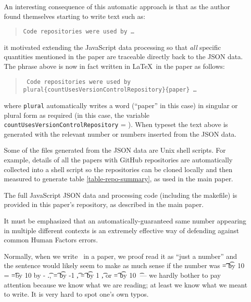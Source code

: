 \documentclass{article}
\begin{document}
An interesting consequence of this automatic approach is that as the author found themselves starting to write text such as:

\begin{quote}
\tt Code repositories were used by  \ldots
\end{quote}

it motivated extending the JavaScript data processing so that \emph{all\/} specific quantities mentioned in the paper are traceable directly back to the JSON data. The phrase above is now in fact written in \LaTeX\ in the paper as follows:

\begin{quote}\tt\small
Code repositories were used by \\
\bslash plural\{\bslash countUsesVersionControlRepository\}\{paper\} \ldots
\end{quote}

where {\tt\small \bslash plural} automatically writes a word (``paper'' in this case) in singular or plural form as required (in this case, the variable \texttt{countUsesVersionControlRepository} = \the\countUsesVersionControlRepository). When typeset the text above is generated with the relevant number or numbers inserted from the JSON data. 

Some of the files generated from the JSON data are Unix shell scripts. For example, details of all the papers with GitHub repositories are automatically collected into a shell script so the repositories can be cloned locally and then measured to generate table \ref{table-repo-summary}, as used in the main paper.

The full JavaScript JSON data and processing code (including the makefile) is provided in this paper's repository, as described in the main paper.

\label{detecting-against-error}
It must be emphasized that an automatically-guaranteed same number appearing in multiple different contexts is an extremely effective way of defending against common Human Factors errors. 


Normally, when we write \the\countUsesVersionControlRepository\ in a paper, we proof read it as ``just a number'' and the sentence would likely seem to make as much sense if the number was 
\newcount\t
\t=\countUsesVersionControlRepository
\divide \t by 10
\newcount\fraction
\fraction=\countUsesVersionControlRepository
\newcount\tent \tent=\t \multiply \tent by 10
\advance\fraction by -\tent
\the\t.\the\fraction,
\t=\countUsesVersionControlRepository
\advance \t by -1
\the\t,
\t=\countUsesVersionControlRepository
\advance \t by 1
\the\t, or
\t=\countUsesVersionControlRepository
\multiply \t by 10
\the\t\ --- we hardly bother to pay attention because we know what we are reading; at least we know what we meant to write. It is very hard to spot one's own typos. 
\end{document}
